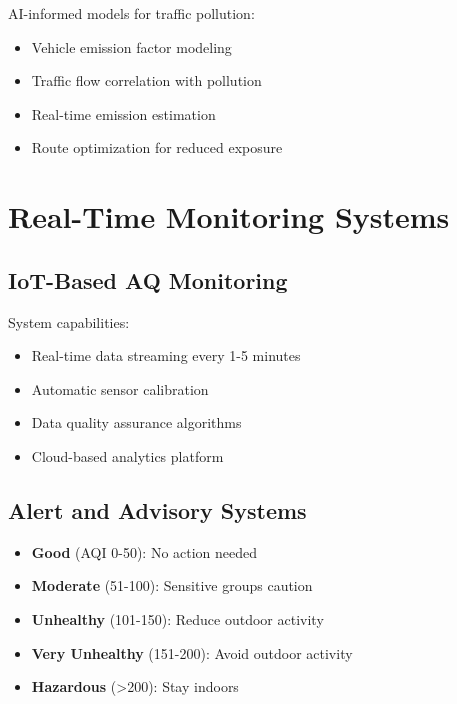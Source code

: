 \documentclass[12pt,a4paper]{article}
\begin{document}
AI-informed models for traffic pollution:
\begin{itemize}
    \item Vehicle emission factor modeling
    \item Traffic flow correlation with pollution
    \item Real-time emission estimation
    \item Route optimization for reduced exposure
\end{itemize}

\section{Real-Time Monitoring Systems}

\subsection{IoT-Based AQ Monitoring}

System capabilities:
\begin{itemize}
    \item Real-time data streaming every 1-5 minutes
    \item Automatic sensor calibration
    \item Data quality assurance algorithms
    \item Cloud-based analytics platform
\end{itemize}

\subsection{Alert and Advisory Systems}

\begin{tcolorbox}[colback=pollutionred!10, colframe=pollutionred, title=Health Advisory Levels]
\begin{itemize}
    \item \textbf{Good} (AQI 0-50): No action needed
    \item \textbf{Moderate} (51-100): Sensitive groups caution
    \item \textbf{Unhealthy} (101-150): Reduce outdoor activity
    \item \textbf{Very Unhealthy} (151-200): Avoid outdoor activity
    \item \textbf{Hazardous} (>200): Stay indoors
\end{itemize}
\end{tcolorbox}
\end{document}
